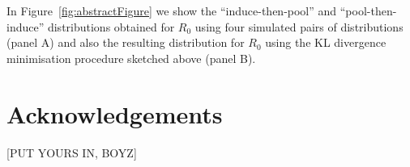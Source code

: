 \documentclass[11pt]{article}
\begin{document}
In Figure~\ref{fig:abstractFigure} we show the ``induce-then-pool'' and ``pool-then-induce'' distributions obtained for $R_0$ using four simulated pairs of distributions (panel A) and also the resulting distribution for $R_0$ using the KL divergence minimisation procedure sketched above (panel B).

\section*{Acknowledgements}
[PUT YOURS IN, BOYZ]


\begin{figure}
\hfill
{}
\hfill

\end{figure}
\end{document}
